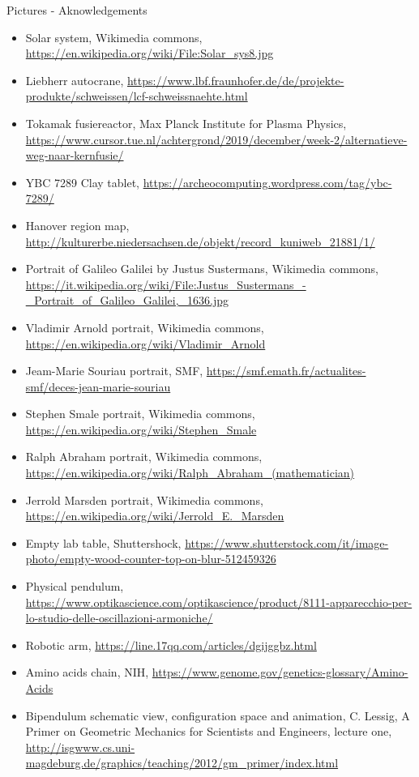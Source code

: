 \documentclass[beamer,handout,10pt]{standalone}
\begin{document}
\begin{frame}[t,allowframebreaks]{Pictures - Aknowledgements}
	\begin{itemize}
		
		\item Solar system, Wikimedia commons,
			\url{https://en.wikipedia.org/wiki/File:Solar_sys8.jpg}
		\item Liebherr autocrane,
			\url{https://www.lbf.fraunhofer.de/de/projekte-produkte/schweissen/lcf-schweissnaehte.html}
		\item Tokamak fusiereactor, Max Planck Institute for Plasma Physics,
			\url{https://www.cursor.tue.nl/achtergrond/2019/december/week-2/alternatieve-weg-naar-kernfusie/} 	
	
		\item YBC 7289 Clay tablet, 
			\url{https://archeocomputing.wordpress.com/tag/ybc-7289/}
		\item Hanover region map,
			\url{http://kulturerbe.niedersachsen.de/objekt/record_kuniweb_21881/1/}
		\item Portrait of Galileo Galilei by Justus Sustermans, Wikimedia commons,
			\url{https://it.wikipedia.org/wiki/File:Justus_Sustermans_-_Portrait_of_Galileo_Galilei,_1636.jpg}
		\item Vladimir Arnold portrait, Wikimedia commons,
			\url{https://en.wikipedia.org/wiki/Vladimir_Arnold}
		\item Jeam-Marie Souriau portrait, SMF, 
			\url{https://smf.emath.fr/actualites-smf/deces-jean-marie-souriau}
		\item Stephen Smale portrait, Wikimedia commons,
			\url{https://en.wikipedia.org/wiki/Stephen_Smale}
		\item Ralph Abraham portrait, Wikimedia commons, 
			\url{https://en.wikipedia.org/wiki/Ralph_Abraham_(mathematician)}
		\item Jerrold Marsden portrait, Wikimedia commons,
			\url{https://en.wikipedia.org/wiki/Jerrold_E._Marsden}
	
		\item Empty lab table, Shuttershock,
			\url{https://www.shutterstock.com/it/image-photo/empty-wood-counter-top-on-blur-512459326}
		\item Physical pendulum,
			\url{https://www.optikascience.com/optikascience/product/8111-apparecchio-per-lo-studio-delle-oscillazioni-armoniche/}
		\item Robotic arm,
			\url{https://line.17qq.com/articles/dgijggbz.html}
		\item Amino acids chain, NIH, 
			\url{https://www.genome.gov/genetics-glossary/Amino-Acids}
		\item Bipendulum schematic view, configuration space and animation, C. Lessig, A Primer on Geometric Mechanics for Scientists and Engineers, lecture one, 
			\url{http://isgwww.cs.uni-magdeburg.de/graphics/teaching/2012/gm_primer/index.html}
		

\end{itemize}
\end{frame}
\end{document}

